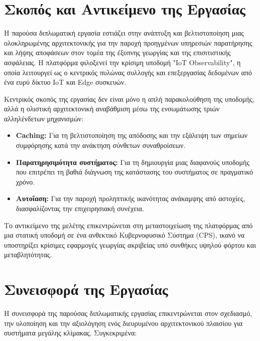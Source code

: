 \section{Σκοπός και Αντικείμενο της Εργασίας}

Η παρούσα διπλωματική εργασία εστιάζει στην ανάπτυξη και βελτιστοποίηση μιας
ολοκληρωμένης αρχιτεκτονικής για την παροχή προηγμένων υπηρεσιών παρατήρησης
και λήψης αποφάσεων στον τομέα της έξυπνης γεωργίας και της επισιτιστικής
ασφάλειας. Η πλατφόρμα φιλοξενεί την κρίσιμη υποδομή "IoT Observability", η
οποία λειτουργεί ως ο κεντρικός πυλώνας συλλογής και επεξεργασίας δεδομένων από
ένα ευρύ δίκτυο IoT και Edge συσκευών.

Κεντρικός σκοπός της εργασίας δεν είναι μόνο η απλή παρακολούθηση της υποδομής,
αλλά η ολιστική αρχιτεκτονική αναβάθμιση μέσω της ενσωμάτωσης τριών
αλληλένδετων μηχανισμών:

\begin{itemize}
	\item \textbf{Caching:} Για τη βελτιστοποίηση της απόδοσης και την
	      εξάλειψη των σημείων συμφόρησης κατά την ανάκτηση σύνθετων
	      συναθροίσεων.
	\item \textbf{Παρατηρησιμότητα συστήματος:} Για τη δημιουργία μιας
	      διαφανούς υποδομής που επιτρέπει τη βαθιά διάγνωση της
	      κατάστασης του συστήματος σε πραγματικό χρόνο.
	\item \textbf{Αυτοΐαση:} Για την παροχή προληπτικής ικανότητας
	      ανάκαμψης από αστοχίες, διασφαλίζοντας την επιχειρησιακή
	      συνέχεια.
\end{itemize}

Το αντικείμενο της μελέτης επικεντρώνεται στη μεταστοιχείωση της πλατφόρμας από
μια στατική υποδομή σε ένα ανθεκτικό Κυβερνοφυσικό Σύστημα (CPS), ικανό να
υποστηρίξει κρίσιμες εφαρμογές γεωργίας ακριβείας υπό συνθήκες υψηλού φόρτου
και μεταβλητότητας.

\section{Συνεισφορά της Εργασίας}

Η συνεισφορά της παρούσας διπλωματικής εργασίας επικεντρώνεται στον σχεδιασμό,
την υλοποίηση και την αξιολόγηση ενός διευρυμένου αρχιτεκτονικού πλαισίου για
συστήματα μεγάλης κλίμακας. Συγκεκριμένα:

